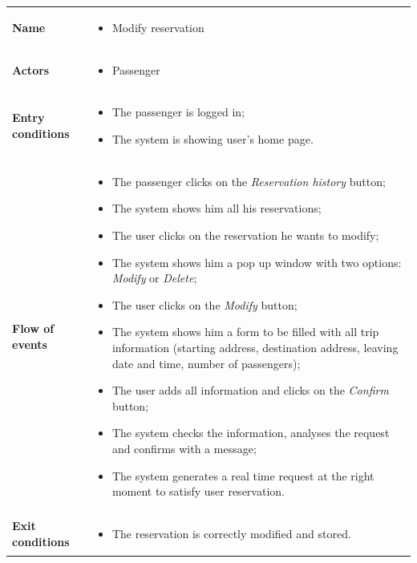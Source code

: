 \begin{table}				
\begin{center}
\begin{tabular}{lp{}}
\toprule
\textbf{Name}		&	\begin{itemize}
					\item Modify reservation
					\end{itemize}	\\
\textbf{Actors}		&	\begin{itemize}
					\item Passenger
					\end{itemize}	\\
\textbf{Entry conditions}	&	\begin{itemize}
					\item The passenger is logged in;
					\item	The system is showing user's home page.
					\end{itemize}	\\
\textbf{Flow of events}	&	\begin{itemize}
					\item	The passenger clicks on the \emph{Reservation history} button;
					\item	The system shows him all his reservations;
					\item	The user clicks on the reservation he wants to modify;
					\item	The system shows him a pop up window with two options: \emph{Modify} or \emph{Delete};
					\item	The user clicks on the \emph{Modify} button;
					\item	The system shows him a form to be filled with all trip information (starting address, destination address, leaving date and time, number of passengers);
					\item	The user adds all information and clicks on the \emph{Confirm} button;
					\item	The system checks the information, analyses the request and confirms with a message;
					\item	The system generates a real time request at the right moment to satisfy user reservation.
					\end{itemize}	\\
\textbf{Exit conditions}	&	\begin{itemize}
					\item	The reservation is correctly modified and stored.
					\end{itemize}	\\

\end{tabular}
\end{center}
\end{table}

